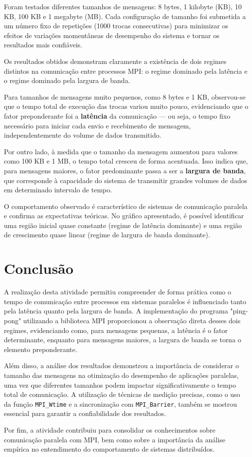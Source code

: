 \documentclass[a4paper, 12pt]{article}
\begin{document}
	\hspace{0.62cm}Foram testados diferentes tamanhos de mensagens: 8 bytes, 1 kilobyte (KB), 10 KB, 100 KB e 1 megabyte (MB). Cada configuração de tamanho foi submetida a um número fixo de repetições (1000 trocas consecutivas) para minimizar os efeitos de variações momentâneas de desempenho do sistema e tornar os resultados mais confiáveis.
	
	Os resultados obtidos demonstram claramente a existência de dois regimes distintos na comunicação entre processos MPI: o regime dominado pela latência e o regime dominado pela largura de banda.
	
	Para tamanhos de mensagens muito pequenos, como 8 bytes e 1 KB, observou-se que o tempo total de execução das trocas variou muito pouco, evidenciando que o fator preponderante foi a \textbf{latência} da comunicação — ou seja, o tempo fixo necessário para iniciar cada envio e recebimento de mensagem, independentemente do volume de dados transmitido.
	
	Por outro lado, à medida que o tamanho da mensagem aumentou para valores como 100 KB e 1 MB, o tempo total cresceu de forma acentuada. Isso indica que, para mensagens maiores, o fator predominante passa a ser a \textbf{largura de banda}, que corresponde à capacidade do sistema de transmitir grandes volumes de dados em determinado intervalo de tempo.
	
	O comportamento observado é característico de sistemas de comunicação paralela e confirma as expectativas teóricas. No gráfico apresentado, é possível identificar uma região inicial quase constante (regime de latência dominante) e uma região de crescimento quase linear (regime de largura de banda dominante).
	
	\section{Conclusão}
	
	\hspace{0.62cm}A realização desta atividade permitiu compreender de forma prática como o tempo de comunicação entre processos em sistemas paralelos é influenciado tanto pela latência quanto pela largura de banda. A implementação do programa "ping-pong" utilizando a biblioteca MPI proporcionou a observação direta desses dois regimes, evidenciando como, para mensagens pequenas, a latência é o fator determinante, enquanto para mensagens maiores, a largura de banda se torna o elemento preponderante.
	
	Além disso, a análise dos resultados demonstrou a importância de considerar o tamanho das mensagens na otimização do desempenho de aplicações paralelas, uma vez que diferentes tamanhos podem impactar significativamente o tempo total de comunicação. A utilização de técnicas de medição precisas, como o uso da função \texttt{MPI\_Wtime} e a sincronização com \texttt{MPI\_Barrier}, também se mostrou essencial para garantir a confiabilidade dos resultados.
	
	Por fim, a atividade contribuiu para consolidar os conhecimentos sobre comunicação paralela com MPI, bem como sobre a importância da análise empírica no entendimento do comportamento de sistemas distribuídos.
	
\end{document}
